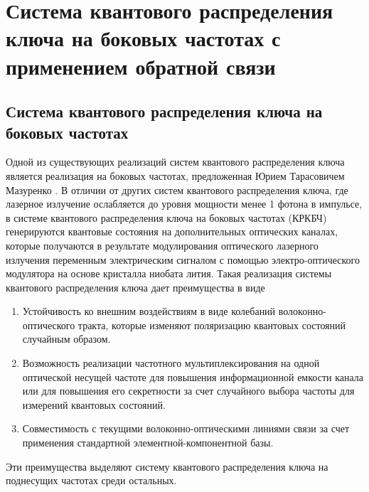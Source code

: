 \chapter{Система квантового распределения ключа на боковых частотах с применением обратной связи}\label{ch:ch2}
\renewcommand{\thefigure}{2.\arabic{figure}} %
\setcounter{figure}{0}                     %


\section{Система квантового распределения ключа на боковых частотах}\label{sec:ch2/sect9}
Одной из существующих реализаций систем квантового распределения ключа является реализация на боковых частотах, предложенная Юрием Тарасовичем Мазуренко \cite{gleim2016}. 
В отличии от других систем квантового распределения ключа, где лазерное излучение ослабляется до уровня мощности менее 1 фотона в импульсе, в системе квантового распределения ключа на боковых частотах (КРКБЧ) \cite{gleim2016} генерируются квантовые состояния на дополнительных оптических каналах, которые получаются в результате модулирования 
оптического лазерного излучения переменным электрическим сигналом с помощью электро-оптического модулятора на основе кристалла ниобата лития.
Такая реализация системы квантового распределения ключа дает преимущества в виде
\begin{enumerate}
    \item Устойчивость ко внешним воздействиям в виде колебаний волоконно-оптического тракта, которые изменяют поляризацию квантовых состояний случайным образом.
    \item Возможность реализации частотного мультиплексирования на одной оптической несущей частоте для повышения информационной емкости канала или для повышения его секретности за счет случайного выбора частоты для измерений квантовых состояний.
    \item Совместимость с текущими волоконно-оптическими линиями связи за счет применения стандартной элементной-компонентной базы. 
\end{enumerate}
Эти преимущества выделяют систему квантового распределения ключа на поднесущих частотах среди остальных.
